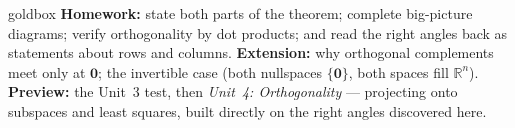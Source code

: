 \documentclass[10pt]{article}
\newcommand{\zero}{\mathbf{0}}
\begin{document}
\begin{skillbox}{goldbox}
\textbf{Homework:} state both parts of the theorem; complete big-picture diagrams; verify orthogonality by
dot products; and read the right angles back as statements about rows and columns. \textbf{Extension:} why
orthogonal complements meet only at $\zero$; the invertible case (both nullspaces $\{\zero\}$, both spaces
fill $\mathbb{R}^n$). \textbf{Preview:} the Unit~3 test, then \emph{Unit~4: Orthogonality} --- projecting
onto subspaces and least squares, built directly on the right angles discovered here.
\end{skillbox}
\end{document}
